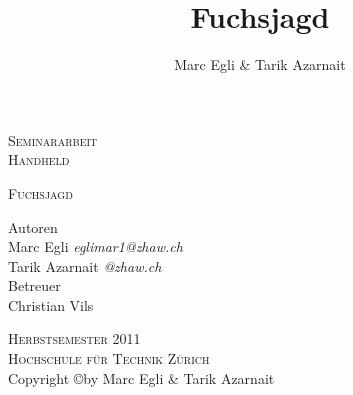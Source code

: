 
\begin{titlepage}
\author{Marc Egli \& Tarik Azarnait} 
\title{Fuchsjagd} 
\date{} 
\begin{center}

\Large
\textsc{Seminararbeit}\\
\textsc{Handheld}\\



\vspace{0.5cm}
\begin{center}
\end{center}
\textsc{Fuchsjagd} 
\vspace{1cm}

\large
Autoren\\
Marc Egli \textsl{eglimar1@zhaw.ch}\\
Tarik Azarnait \textsl{@zhaw.ch}\\

\vspace{1cm}
Betreuer\\
Christian Vils\\
\vspace{1.0cm}




\textsc{Herbstsemester 2011}\\
\textsc{Hochschule für Technik Zürich}\\
\vspace{0.5cm}
\normalsize
Copyright \copyright  by Marc Egli \& Tarik Azarnait

\end{center}

\end{titlepage}
\newpage
